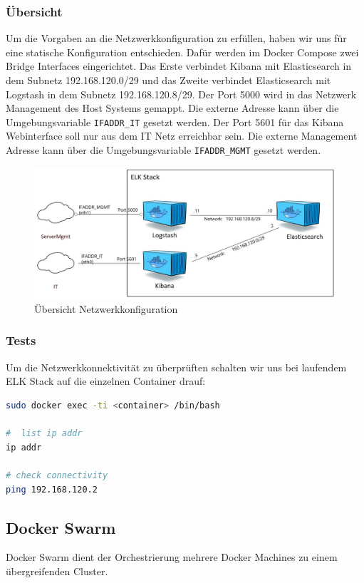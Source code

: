 \subsubsection{Übersicht}
\label{sec:docker_networkconf}
Um die Vorgaben an die Netzwerkkonfiguration zu erfüllen, haben wir uns für eine statische Konfiguration entschieden. Dafür werden im Docker Compose zwei Bridge Interfaces eingerichtet. Das Erste verbindet Kibana mit Elasticsearch in dem Subnetz 192.168.120.0/29 und das Zweite verbindet Elasticsearch mit Logstash in dem Subnetz 192.168.120.8/29. Der Port 5000 wird in das Netzwerk Management des Host Systems gemappt. Die externe Adresse kann über die Umgebungsvariable \lstinline[]|IFADDR_IT| gesetzt werden. Der Port 5601 für das Kibana Webinterface soll nur aus dem IT Netz erreichbar sein. Die externe Management Adresse kann über die Umgebungsvariable \lstinline[]|IFADDR_MGMT| gesetzt werden.
\begin{figure}[h]
\centering
\includegraphics[width=0.7\linewidth]{images/docker_network_conf}
\caption{Übersicht Netzwerkkonfiguration}
\label{fig:dockernetworkconf}
\end{figure}
\newpage


\subsubsection{Tests}
Um die Netzwerkkonnektivität zu überprüften schalten wir uns bei laufendem ELK Stack auf die einzelnen Container drauf:
\begin{lstlisting}[language=bash]
sudo docker exec -ti <container> /bin/bash

#  list ip addr
ip addr 

# check connectivity
ping 192.168.120.2
\end{lstlisting}

\subsection{Docker Swarm}
Docker Swarm dient der Orchestrierung mehrere Docker Machines zu einem übergreifenden Cluster.

